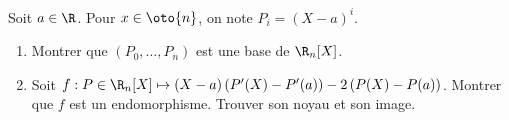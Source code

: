 \begin{enonce}
\begin{exercise}[ID={RMS133 E1275},subtitle={CCINP MP 2022},tags={},difficulty={}]
Soit $a\in\R$.
Pour $x\in\oto{n}$, on note $P_i=(X-a)^i$.
\begin{enumerate}
  \item Montrer que $(P_0,\dots,P_n)$ est une base de $\R_n[X]$.
  \item Soit $f:P\in\R_n[X]\mapsto (X-a)\left( P'(X) - P'(a) \right) - 2\left( P(X) - P(a) \right)$.
    Montrer que $f$ est un endomorphisme.
    Trouver son noyau et son image.
\end{enumerate}
\end{exercise}
\begin{solution}
\end{solution}
\end{enonce}
